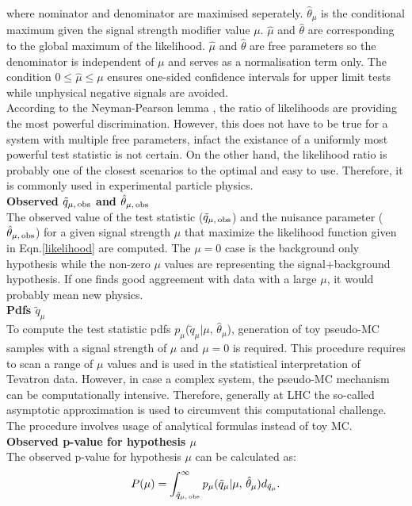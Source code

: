 where nominator and denominator are maximised seperately. $\hat{\theta}_{\mu}$ is the conditional maximum given the signal strength modifier value $\mu$. $\hat{\mu}$ and $\hat{\theta}$ are corresponding to the global maximum of the likelihood. $\hat{\mu}$ and $\hat{\theta}$ are free parameters so the denominator is independent of $\mu$ and serves as a normalisation term only. The condition $0\leq\hat{\mu}\leq\mu$ ensures one-sided confidence intervals for upper limit tests while unphysical negative signals are avoided.\\
According to the Neyman-Pearson lemma \cite{Lemma}, the ratio of likelihoods are providing the most powerful discrimination. However, this does not have to be true for a system with multiple free parameters, infact the existance of a uniformly most powerful test statistic is not certain. On the other hand, the likelihood ratio is probably one of the closest scenarios to the optimal and easy to use. Therefore, it is commonly used in experimental particle physics.
\\
\textbf{Observed $\tilde{q}_{\mu,\,\rm obs}$ and $\hat{\theta}_{\mu,\,\rm obs}$}\\
The observed value of the test statistic ($\tilde{q}_{\mu,\,\rm obs}$) and the nuisance parameter ($\hat{\theta}_{\mu,\,\rm obs}$)  for a given signal strength $\mu$ that maximize the likelihood function given in Eqn.\ref{likelihood} are computed. The $\mu=0$ case is the background only hypothesis while the non-zero $\mu$ values are representing the signal+background hypothesis. If one finds good aggreement with data with a large $\mu$, it would probably mean new physics. \\
\textbf{Pdfs $\tilde{q}_{\mu}$}\\
To compute the test statistic pdfs $p_{\mu}$($\tilde{q}_{\mu}|\mu,\,\hat{\theta}_{\mu}$), generation of toy pseudo-MC samples with a signal strength of $\mu$ and $\mu=0$ is required. This procedure requires to scan a range of $\mu$ values and is used in the statistical interpretation of Tevatron data. However, in case a complex system, the pseudo-MC mechanism can be computationally intensive. Therefore, generally at LHC the so-called asymptotic approximation is used to circumvent this computational challenge. The procedure involves usage of analytical formulas instead of toy MC.\\
\textbf{Observed p-value for hypothesis $\mu$}\\
The observed p-value for hypothesis $\mu$ can be calculated as:
\begin{equation}
\label{p-value}
  P(\mu) = \int_{\tilde{q}_{\mu,\,\rm obs}}^{\infty} p_{\mu}(\tilde{q}_{\mu} | \mu,\,\hat{\theta}_{\mu}) d_{{\tilde q}_{\mu}}.
\end{equation}
